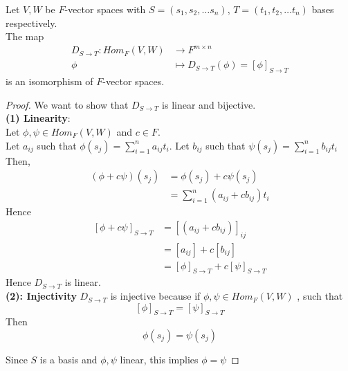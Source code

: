 \begin{theorem}
    Let $V, W$ be $F$-vector spaces with $S = (s_1, s_2, \hdots s_n)$, $T = (t_1, t_2, \hdots t_n)$ bases respectively. \\

    The map 
    \begin{align*}
        D_{S \to T} : Hom_F(V, W) &\to F^{m \times n} \\
        \phi & \mapsto D_{S \to T} (\phi) = \left[ \phi \right]_{S \to T}
    \end{align*}
    is an isomorphism of $F$-vector spaces.
\end{theorem}

\begin{proof} 
    We want to show that $D_{S \to T}$ is linear and bijective. \\

    \textbf{(1) Linearity}:  \\
    Let $\phi, \psi \in Hom_F(V, W)$  and $c \in F$. \\

    Let $a_{ij}$ such that $\phi(s_j) = \sum\limits_{i = 1}^{n} a_{ij} t_i$. Let $b_{ij}$ such that $\psi(s_j) = \sum\limits_{i = 1}^{n} b_{ij} t_i$ \\

    Then, 
    \begin{align*}
        \left( \phi + c \psi \right)  (s_j) &= \phi(s_j) + c \psi(s_j) \\
        &= \sum\limits_{i = 1}^{n}  (a_{ij} + cb_{ij}) t_i
    \end{align*}
    Hence 
    \begin{align*}
        \left[ \phi + c \psi \right]_{S \to T} &= \left[ \left( a_{ij }  + cb_{ij}\right)  \right]_{ij} \\
        &= \left[ a_{ij}  \right]  + c \left[ b_{ij}  \right] \\
        &= \left[ \phi \right]_{S \to T} + c \left[ \psi \right]_{S \to T}
    \end{align*}
    Hence $D_{S \to T}$ is linear. \\

    \textbf{(2): Injectivity}
    $D_{S \to T}$ is injective because if $ \phi, \psi \in Hom_F(V, W)$ , such that 
    \[
        \left[ \phi \right]_{S \to T} = \left[ \psi \right]_{S \to T}
    \]
    Then
    \[
        \phi(s_j) = \psi(s_j)
    \]

    Since $S$ is a basis and $\phi, \psi$ linear, this implies $\phi = \psi$
    
\end{proof}









\newpage